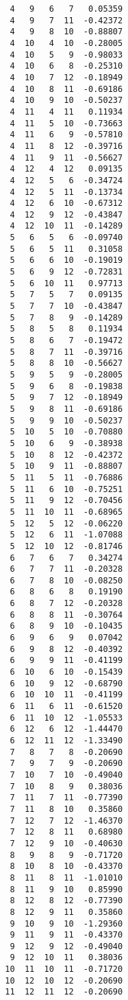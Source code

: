 \documentclass[prc]{revtex4}
\begin{document}
\begin{verbatim}
   4   9   6   7   0.05359
   4   9   7  11  -0.42372
   4   9   8  10  -0.88807
   4  10   4  10  -0.28005
   4  10   5   9  -0.98033
   4  10   6   8  -0.25310
   4  10   7  12  -0.18949
   4  10   8  11  -0.69186
   4  10   9  10  -0.50237
   4  11   4  11   0.11934
   4  11   5  10  -0.73663
   4  11   6   9  -0.57810
   4  11   8  12  -0.39716
   4  11   9  11  -0.56627
   4  12   4  12   0.09135
   4  12   5   6  -0.34724
   4  12   5  11  -0.13734
   4  12   6  10  -0.67312
   4  12   9  12  -0.43847
   4  12  10  11  -0.14289
   5   6   5   6  -0.09740
   5   6   5  11   0.31058
   5   6   6  10  -0.19019
   5   6   9  12  -0.72831
   5   6  10  11   0.97713
   5   7   5   7   0.09135
   5   7   7  10  -0.43847
   5   7   8   9  -0.14289
   5   8   5   8   0.11934
   5   8   6   7  -0.19472
   5   8   7  11  -0.39716
   5   8   8  10  -0.56627
   5   9   5   9  -0.28005
   5   9   6   8  -0.19838
   5   9   7  12  -0.18949
   5   9   8  11  -0.69186
   5   9   9  10  -0.50237
   5  10   5  10  -0.70880
   5  10   6   9  -0.38938
   5  10   8  12  -0.42372
   5  10   9  11  -0.88807
   5  11   5  11  -0.76886
   5  11   6  10  -0.75251
   5  11   9  12  -0.70456
   5  11  10  11  -0.68965
   5  12   5  12  -0.06220
   5  12   6  11  -1.07088
   5  12  10  12  -0.81746
   6   7   6   7   0.34274
   6   7   7  11  -0.20328
   6   7   8  10  -0.08250
   6   8   6   8   0.19190
   6   8   7  12  -0.20328
   6   8   8  11  -0.30764
   6   8   9  10  -0.10435
   6   9   6   9   0.07042
   6   9   8  12  -0.40392
   6   9   9  11  -0.41199
   6  10   6  10  -0.15439
   6  10   9  12  -0.68790
   6  10  10  11  -0.41199
   6  11   6  11  -0.61520
   6  11  10  12  -1.05533
   6  12   6  12  -1.44470
   6  12  11  12  -1.33490
   7   8   7   8  -0.20690
   7   9   7   9  -0.20690
   7  10   7  10  -0.49040
   7  10   8   9   0.38036
   7  11   7  11  -0.77390
   7  11   8  10   0.35860
   7  12   7  12  -1.46370
   7  12   8  11   0.68980
   7  12   9  10  -0.40630
   8   9   8   9  -0.71720
   8  10   8  10  -0.43370
   8  11   8  11  -1.01010
   8  11   9  10   0.85990
   8  12   8  12  -0.77390
   8  12   9  11   0.35860
   9  10   9  10  -1.29360
   9  11   9  11  -0.43370
   9  12   9  12  -0.49040
   9  12  10  11   0.38036
  10  11  10  11  -0.71720
  10  12  10  12  -0.20690
  11  12  11  12  -0.20690
\end{verbatim}
\end{document}
